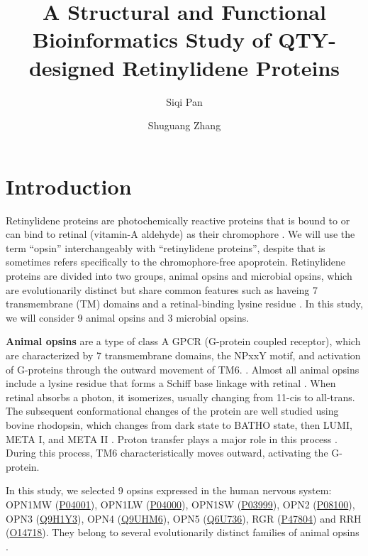 \documentclass[fleqn,10pt,lineno]{manuscript}
\title{A Structural and Functional Bioinformatics Study of QTY-designed Retinylidene Proteins}
\author[1]{Siqi Pan}
\author[2]{Shuguang Zhang}
\affil[1]{Shanghai World Foreign Language Academy, 400 Baihua Street, Shanghai 200233, China}
\affil[2]{Lab of Molecular Architecture, Media Lab, Massachusetts Institute of Technology, 77 Massachusetts Avenue, Cambridge, MA 02139, USA}
\begin{document}
\flushbottom
\maketitle
\thispagestyle{empty}

\section*{Introduction}

Retinylidene proteins are photochemically reactive proteins that is bound to or can bind to retinal (vitamin-A aldehyde) as their chromophore \citep{Spudich_2000}. We will use the term ``opsin'' interchangeably with ``retinylidene proteins'', despite that is sometimes refers specifically to the chromophore-free apoprotein. Retinylidene proteins are divided into two groups, animal opsins and microbial opsins, which are evolutionarily distinct but share common features such as haveing 7 transmembrane (TM) domains and a retinal-binding lysine residue \citep{Yee_2013, Spudich_2000}. In this study, we will consider 9 animal opsins and 3 microbial opsins. 

\textbf{Animal opsins} are a type of class A GPCR (G-protein coupled receptor), which are characterized by 7 transmembrane domains, the NPxxY motif, and activation of G-proteins through the outward movement of TM6. \citep{Sakmar_2002, Nordstrom_2011, Zhou_2019}. Almost all animal opsins include a lysine residue that forms a Schiff base linkage with retinal \citep{Bownds_1967, Guhmann_2022}. When retinal absorbs a photon, it isomerizes, usually changing from 11-cis to all-trans. The subsequent conformational changes of the protein are well studied using bovine rhodopsin, which changes from dark state to BATHO state, then LUMI, META I, and META II \citep{Okada_2001, Smith_2010}. Proton transfer plays a major role in this process \citep{Mahalingam_2008}. During this process, TM6 characteristically moves outward, activating the G-protein. 

In this study, we selected 9 opsins expressed in the human nervous system: OPN1MW (\href{https://www.uniprot.org/uniprotkb/P04001/entry}{P04001}), OPN1LW (\href{https://www.uniprot.org/uniprotkb/P04000/entry}{P04000}), OPN1SW (\href{https://www.uniprot.org/uniprotkb/P03999/entry}{P03999}), OPN2 (\href{https://www.uniprot.org/uniprotkb/P08100/entry}{P08100}), OPN3 (\href{https://www.uniprot.org/uniprotkb/Q9H1Y3/entry}{Q9H1Y3}), OPN4 (\href{https://www.uniprot.org/uniprotkb/Q9UHM6/entry}{Q9UHM6}), OPN5 (\href{https://www.uniprot.org/uniprotkb/Q6U736/entry}{Q6U736}), RGR (\href{https://www.uniprot.org/uniprotkb/P47804/entry}{P47804}) and RRH (\href{https://www.uniprot.org/uniprotkb/O14718/entry}{O14718}). They belong to several evolutionarily distinct families of animal opsins \citep{Terakita_2005, Shichida_2009}. 
\end{document}
